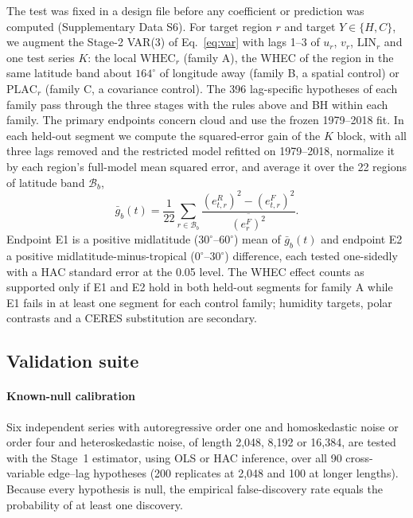\documentclass[preprint,12pt]{elsarticle}
\begin{document}
The test was fixed in a design file before any coefficient or prediction was computed (Supplementary Data S6). For target region $r$ and target $Y\in\{H,C\}$, we augment the Stage-2 VAR(3) of Eq.~\eqref{eq:var} with lags 1--3 of $u_r$, $v_r$, $\mathrm{LIN}_r$ and one test series $K$: the local $\mathrm{WHEC}_r$ (family A), the WHEC of the region in the same latitude band about $164^\circ$ of longitude away (family B, a spatial control) or $\mathrm{PLAC}_r$ (family C, a covariance control). The 396 lag-specific hypotheses of each family pass through the three stages with the rules above and BH within each family. The primary endpoints concern cloud and use the frozen 1979--2018 fit. In each held-out segment we compute the squared-error gain of the $K$ block, with all three lags removed and the restricted model refitted on 1979--2018, normalize it by each region's full-model mean squared error, and average it over the 22 regions of latitude band $\mathcal{B}_b$,
\begin{equation}
\bar{g}_b(t)=\frac{1}{22}\sum_{r\in\mathcal{B}_b}\frac{\left(e^{R}_{t,r}\right)^{2}-\left(e^{F}_{t,r}\right)^{2}}{\overline{\left(e^{F}_{r}\right)^{2}}}.
\label{eq:bandgain}
\end{equation}
Endpoint E1 is a positive midlatitude ($30^\circ$--$60^\circ$) mean of $\bar{g}_b(t)$ and endpoint E2 a positive midlatitude-minus-tropical ($0^\circ$--$30^\circ$) difference, each tested one-sidedly with a HAC standard error at the 0.05 level. The WHEC effect counts as supported only if E1 and E2 hold in both held-out segments for family A while E1 fails in at least one segment for each control family; humidity targets, polar contrasts and a CERES substitution are secondary.

\subsection{Validation suite}
\label{subsec:validation}

\paragraph{Known-null calibration} Six independent series with autoregressive order one and homoskedastic noise or order four and heteroskedastic noise, of length 2,048, 8,192 or 16,384, are tested with the Stage~1 estimator, using OLS or HAC inference, over all 90 cross-variable edge--lag hypotheses (200 replicates at 2,048 and 100 at longer lengths). Because every hypothesis is null, the empirical false-discovery rate equals the probability of at least one discovery.
\end{document}
